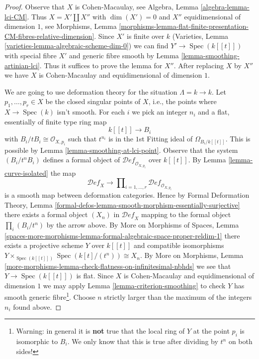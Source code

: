 \documentclass[10pt,a4paper]{amsart}
\theoremstyle{plain}
\theoremstyle{definition}
\theoremstyle{remark}
\numberwithin{equation}{subsection}
\def\Spec{\mathop{\mathrm{Spec}}}
\def\Deformationcategory{\mathcal{D}\!\mathit{ef}}
\begin{document}
\begin{proof}
Observe that $X$ is Cohen-Macaulay, see
Algebra, Lemma \ref{algebra-lemma-lci-CM}.
Thus $X = X' \amalg X''$ with $\dim(X') = 0$
and $X''$ equidimensional of dimension $1$, see Morphisms, Lemma
\ref{morphisms-lemma-flat-finite-presentation-CM-fibres-relative-dimension}.
Since $X'$ is finite over $k$ (Varieties, Lemma
\ref{varieties-lemma-algebraic-scheme-dim-0})
we can find $Y' \to \Spec(k[[t]])$ with special
fibre $X'$ and generic fibre smooth by
Lemma \ref{lemma-smoothing-artinian-lci}.
Thus it suffices to prove the lemma for $X''$.
After replacing $X$ by $X''$ we have $X$ is
Cohen-Macaulay and equidimensional of dimension $1$.

\medskip\noindent
We are going to use deformation theory for the situation $\Lambda = k \to k$.
Let $p_1, \ldots, p_r \in X$ be the closed singular points of $X$, i.e.,
the points where $X \to \Spec(k)$ isn't smooth. For each $i$ we pick
an integer $n_i$ and a flat, essentially of finite type ring map
$$
k[[t]] \longrightarrow B_i
$$
with $B_i/tB_i \cong \mathcal{O}_{X, p_i}$ such that
$t^{n_i}$ is in the $1$st Fitting ideal of $\Omega_{B_i/k[[t]]}$.
This is possible by Lemma \ref{lemma-smoothing-at-lci-point}.
Observe that the system $(B_i/t^nB_i)$ defines a formal object of
$\Deformationcategory_{\mathcal{O}_{X, p_i}}$ over $k[[t]]$.
By Lemma \ref{lemma-curve-isolated} the map
$$
\Deformationcategory_X
\longrightarrow
\prod\nolimits_{i = 1, \ldots, r} \Deformationcategory_{\mathcal{O}_{X, p_i}}
$$
is a smooth map between deformation categories. Hence by
Formal Deformation Theory, Lemma
\ref{formal-defos-lemma-smooth-morphism-essentially-surjective}
there exists a formal object $(X_n)$ in $\Deformationcategory_X$
mapping to the formal object $\prod_i (B_i/t^n)$ by the arrow above.
By More on Morphisms of Spaces, Lemma
\ref{spaces-more-morphisms-lemma-formal-algebraic-space-proper-reldim-1}
there exists a projective scheme $Y$ over $k[[t]]$ and compatible
isomorphisms $Y \times_{\Spec(k[[t]])} \Spec(k[t]/(t^n)) \cong X_n$.
By More on Morphisms, Lemma
\ref{more-morphisms-lemma-check-flatness-on-infinitesimal-nbhds}
we see that $Y \to \Spec(k[[t]])$ is flat.
Since $X$ is Cohen-Macaulay and equidimensional of dimension $1$
we may apply Lemma \ref{lemma-criterion-smoothing}
to check $Y$ has smooth generic fibre\footnote{Warning: in general it is
{\bf not} true that the local ring of $Y$ at the point
$p_i$ is isomorphic to $B_i$. We only know that this is true after
dividing by $t^n$ on both sides!}.
Choose $n$ strictly larger than the maximum of the integers $n_i$ found above.

\end{proof}
\end{document}
